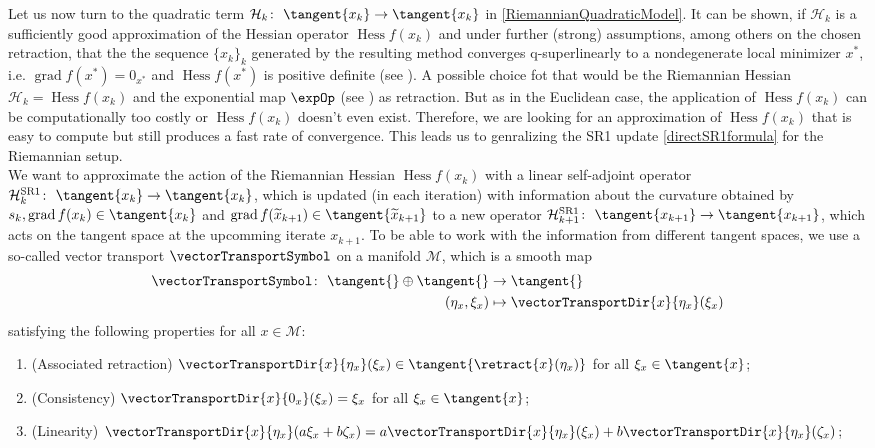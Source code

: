 Let us now turn to the quadratic term $\mathcal{H}_k \colon \ \tangent{x_k} \to \tangent{x_k}$ in \cref{RiemannianQuadraticModel}. It can be shown, if $\mathcal{H}_k$ is a sufficiently good approximation of the Hessian operator $\operatorname{Hess} f(x_k)$ and under further (strong) assumptions, among others on the chosen retraction, that the the sequence $\{ x_k \}_k$ generated by the resulting method converges q-superlinearly to a nondegenerate local minimizer $x^*$, i.e. $\operatorname{grad} f(x^*) = 0_{x^*}$ and $\operatorname{Hess} f(x^*)$ is positive definite (see \cite[Theorem~4.13]{AbsilBakerGallivan:2007}). A possible choice fot that would be the Riemannian Hessian $\mathcal{H}_k = \operatorname{Hess} f(x_k)$ and the exponential map $\expOp$ (see \cite[p.~102]{AbsilMahonySepulchre:2008}) as retraction. But as in the Euclidean case, the application of $\operatorname{Hess} f(x_k)$ can be computationally too costly or $\operatorname{Hess} f(x_k)$ doesn't even exist. Therefore, we are looking for an approximation of $\operatorname{Hess} f(x_k)$ that is easy to compute but still produces a fast rate of convergence. This leads us to genralizing the SR1 update \cref{directSR1formula} for the Riemannian setup. \\
We want to approximate the action of the Riemannian Hessian $\operatorname{Hess} f(x_k)$ with a linear self-adjoint operator $\mathcal{H}^\mathrm{SR1}_k \colon \ \tangent{x_k} \to \tangent{x_k}$, which is updated (in each iteration) with information about the curvature obtained by $s_k, \operatorname{grad} f(x_k) \in \tangent{x_k}$ and $\operatorname{grad} f(\widetilde{x}_{k+1}) \in \tangent{\widetilde{x}_{k+1}}$ to a new operator $\mathcal{H}^\mathrm{SR1}_{k+1} \colon \ \tangent{x_{k+1}} \to \tangent{x_{k+1}}$, which acts on the tangent space at the upcomming iterate $x_{k+1}$. To be able to work with the information from different tangent spaces, we use a so-called vector transport $\vectorTransportSymbol$ on a manifold $\mathcal{M}$, which is a smooth map 
\begin{align*}
    \vectorTransportSymbol \colon \ \tangent{} \oplus \tangent{} & \to \tangent{} \\
    (\eta_x, \xi_x) & \mapsto \vectorTransportDir{x}{\eta_x}(\xi_x)
\end{align*}      
satisfying the following properties for all $x \in \mathcal{M}$:
\begin{enumerate}
    \item (Associated retraction) $\vectorTransportDir{x}{\eta_x}(\xi_x) \in \tangent{\retract{x}(\eta_x)}$ for all $\xi_x \in \tangent{x}$;
    \item (Consistency) $\vectorTransportDir{x}{0_x}(\xi_x) = \xi_x$ for all $\xi_x \in \tangent{x}$;
    \item (Linearity) $\vectorTransportDir{x}{\eta_x}(a \xi_x + b \zeta_x) = a \vectorTransportDir{x}{\eta_x}(\xi_x) + b \vectorTransportDir{x}{\eta_x}(\zeta_x)$;
\end{enumerate}

